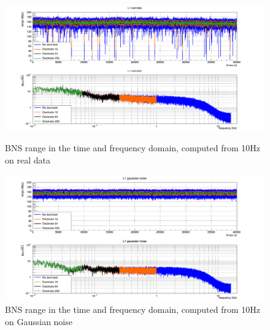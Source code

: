 \begin{figure}
  \centering
  \begin{minipage}{\linewidth}
    \includegraphics[width=\linewidth]{sectionBadTriggers/PSD/Range/range_PSD/cReal_L1_BNS.png}
    \caption{BNS range in the time and frequency domain, computed from 10Hz on real data}
    \label{fig:rangeReal_BNS_10}
  \end{minipage}
  \hfill
  \vspace{0.4cm}
  \begin{minipage}{\linewidth}
    \includegraphics[width=\linewidth]{sectionBadTriggers/PSD/Range/range_PSD/cGaus_L1_BNS.png}
    \caption{BNS range in the time and frequency domain, computed from 10Hz on Gaussian noise}
    \label{fig:rangeGaus_BNS_10}
  \end{minipage}
\end{figure}


